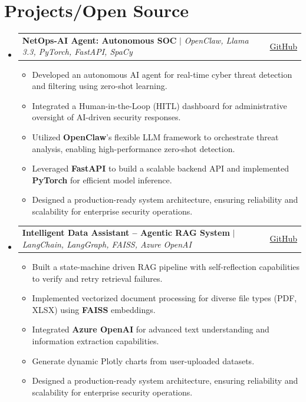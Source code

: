 \documentclass[10pt, a4paper]{article}
\makeatletter
\newcommand{\resumeItem}[1]{
  \item\small{
    {#1 \vspace{-2pt}}
  }
}
\newcommand{\resumeProjectHeading}[2]{
    \item
    \begin{tabular*}{\linewidth}{@{}l@{\extracolsep{\fill}}r@{}}
      \small#1 & \small#2 \\
    \end{tabular*}\vspace{-7pt}
}
\makeatother
\begin{document}
\section{Projects/Open Source}
    \begin{itemize}[leftmargin=0.02in, label={}]
      
      \resumeProjectHeading
        {\textbf{NetOps-AI Agent: Autonomous SOC} $|$ \textit{OpenClaw, Llama 3.3, PyTorch, FastAPI, SpaCy}}{\href{https://github.com/mahfuz-raihan/netops-ai-agent}{GitHub}}
        \begin{itemize}
          \resumeItem{Developed an autonomous AI agent for real-time cyber threat detection and filtering using zero-shot learning.}
          \resumeItem{Integrated a Human-in-the-Loop (HITL) dashboard for administrative oversight of AI-driven security responses.}
          \resumeItem{Utilized \textbf{OpenClaw}'s flexible LLM framework to orchestrate threat analysis, enabling high-performance zero-shot detection.}
          \resumeItem{Leveraged \textbf{FastAPI} to build a scalable backend API and implemented \textbf{PyTorch} for efficient model inference.}
          \resumeItem{Designed a production-ready system architecture, ensuring reliability and scalability for enterprise security operations.}
        \end{itemize}

      \resumeProjectHeading
        {\textbf{Intelligent Data Assistant -- Agentic RAG System} $|$ \textit{LangChain, LangGraph, FAISS, Azure OpenAI}}{\href{https://github.com/mahfuz-raihan/agentic-rag-system}{GitHub}}
        \begin{itemize}
          \resumeItem{Built a state-machine driven RAG pipeline with self-reflection capabilities to verify and retry retrieval failures.}
          \resumeItem{Implemented vectorized document processing for diverse file types (PDF, XLSX) using \textbf{FAISS} embeddings.}
          \resumeItem{Integrated \textbf{Azure OpenAI} for advanced text understanding and information extraction capabilities.}
          \resumeItem{Generate dynamic Plotly charts from user-uploaded datasets.}
          \resumeItem{Designed a production-ready system architecture, ensuring reliability and scalability for enterprise security operations.}
        \end{itemize}
      

\end{itemize}
\end{document}

